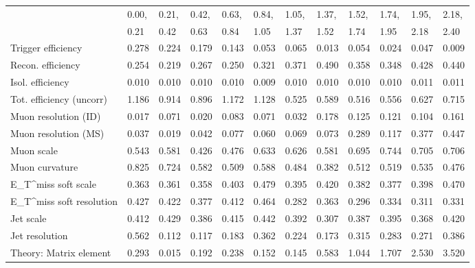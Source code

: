 \begin{tabular}{l|p{0.6cm}p{0.6cm}p{0.6cm}p{0.6cm}p{0.6cm}p{0.6cm}p{0.6cm}p{0.6cm}p{0.6cm}p{0.6cm}p{0.6cm}}
\hline
   & 0.00, & 0.21, & 0.42, & 0.63, & 0.84, & 1.05, & 1.37, & 1.52, & 1.74, & 1.95, & 2.18,  \\ 
   & 0.21 & 0.42 & 0.63 & 0.84 & 1.05 & 1.37 & 1.52 & 1.74 & 1.95 & 2.18 & 2.40  \\ 
\hline
Trigger efficiency                       & 0.278 & 0.224 & 0.179 & 0.143 & 0.053 & 0.065 & 0.013 & 0.054 & 0.024 & 0.047 & 0.009 \\
Recon. efficiency                        & 0.254 & 0.219 & 0.267 & 0.250 & 0.321 & 0.371 & 0.490 & 0.358 & 0.348 & 0.428 & 0.440 \\
Isol. efficiency                         & 0.010 & 0.010 & 0.010 & 0.010 & 0.009 & 0.010 & 0.010 & 0.010 & 0.010 & 0.011 & 0.011 \\
Tot. efficiency (uncorr)                 & 1.186 & 0.914 & 0.896 & 1.172 & 1.128 & 0.525 & 0.589 & 0.516 & 0.556 & 0.627 & 0.715 \\
Muon resolution (ID)                     & 0.017 & 0.071 & 0.020 & 0.083 & 0.071 & 0.032 & 0.178 & 0.125 & 0.121 & 0.104 & 0.161 \\
Muon resolution (MS)                     & 0.037 & 0.019 & 0.042 & 0.077 & 0.060 & 0.069 & 0.073 & 0.289 & 0.117 & 0.377 & 0.447 \\
Muon scale                               & 0.543 & 0.581 & 0.426 & 0.476 & 0.633 & 0.626 & 0.581 & 0.695 & 0.744 & 0.705 & 0.706 \\
Muon curvature                           & 0.825 & 0.724 & 0.582 & 0.509 & 0.588 & 0.484 & 0.382 & 0.512 & 0.519 & 0.535 & 0.476 \\
E_{T}^{miss} soft scale                  & 0.363 & 0.361 & 0.358 & 0.403 & 0.479 & 0.395 & 0.420 & 0.382 & 0.377 & 0.398 & 0.470 \\
E_{T}^{miss} soft resolution             & 0.427 & 0.422 & 0.377 & 0.412 & 0.464 & 0.282 & 0.363 & 0.296 & 0.334 & 0.311 & 0.331 \\
Jet scale                                & 0.412 & 0.429 & 0.386 & 0.415 & 0.442 & 0.392 & 0.307 & 0.387 & 0.395 & 0.368 & 0.420 \\
Jet resolution                           & 0.562 & 0.112 & 0.117 & 0.183 & 0.362 & 0.224 & 0.173 & 0.315 & 0.283 & 0.271 & 0.386 \\
Theory: Matrix element                   & 0.293 & 0.015 & 0.192 & 0.238 & 0.152 & 0.145 & 0.583 & 1.044 & 1.707 & 2.530 & 3.520 \\

\end{tabular}
